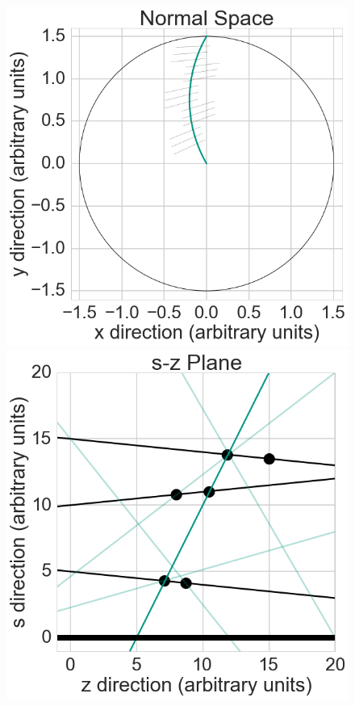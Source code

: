 \begin{figure}
 \centering
 \includegraphics[scale=0.3]{figures/theory/stereo_1.png}
 \hspace*{1cm}
 \includegraphics[scale=0.3]{figures/theory/stereo_2.png}
 

\end{figure}
